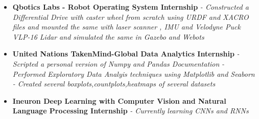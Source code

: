 \documentclass{article}
\begin{document}
    \begin{itemize}
        \item{\textbf{\large{Qbotics Labs - Robot Operating System Internship}}}
        \newline
        \textit{- Constructed a Differential Drive with caster wheel from scratch using URDF and XACRO files and mounted the same with laser scanner , IMU and Velodyne Puck VLP-16 Lidar and simulated the same in Gazebo and Webots}
    \end{itemize}
    \begin{itemize}
        \item{\textbf{\large{United Nations TakenMind-Global Data Analytics Internship}}}
        \newline
        \textit{- Scripted a personal version of Numpy and Pandas Documentation }
        \newline
        \textit{- Performed Exploratory Data Analyis techniques using Matplotlib and Seaborn }
        \newline
        \textit{- Created several boxplots,countplots,heatmaps of several datasets}
    \end{itemize}
    \begin{itemize}
        \item{\textbf{\large{Ineuron Deep Learning with Computer Vision and Natural Language Processing Internship}}}
        \newline
        \textit{- Currently learning CNNs and RNNs }
    \end{itemize}
\end{document}
